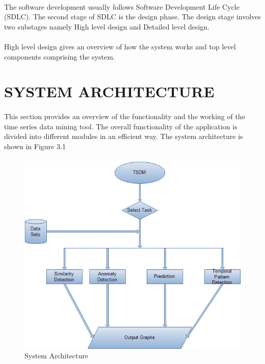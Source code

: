 \documentclass[12pt]{report}
\begin{document}
\paragraph{}The software development usually follows Software Development Life Cycle (SDLC). The second stage of SDLC is the design phase. The design stage involves two substages namely High level design and Detailed level design.\\
\paragraph{} High level design gives an overview of how the system works and top level components comprising the system.

\section{SYSTEM ARCHITECTURE}
\paragraph{}This section provides an overview of  the functionality and the working of the time series data mining tool. The overall functionality of the application is divided into different modules in an efficient way. The system architecture is shown in Figure 3.1
\paragraph{}

\begin{figure}[h!]
	\centering
		\includegraphics[scale=0.7]{system-architecture.png}
		\caption{System Architecture}
\end{figure} 
\end{document}
